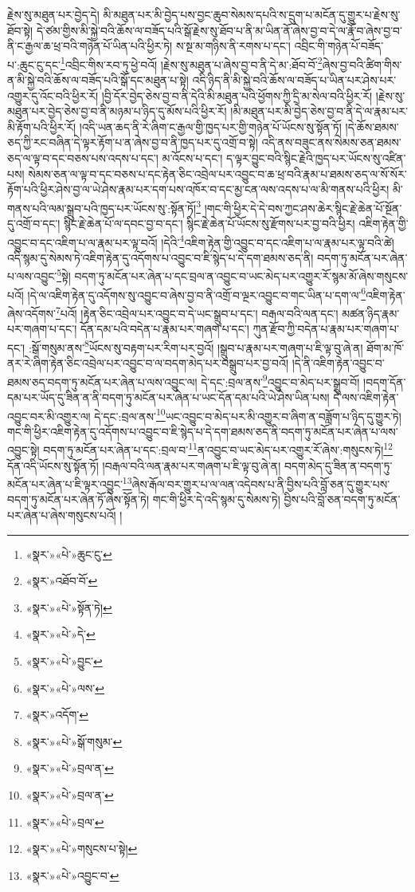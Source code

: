 རྗེས་སུ་མཐུན་པར་བྱེད་དེ། མི་མཐུན་པར་མི་བྱེད་པས་བྱང་ཆུབ་སེམས་དཔའི་ས་དྲུག་པ་མངོན་དུ་གྱུར་པ་རྗེས་སུ་ཐོབ་སྟེ། དེ་ཙམ་གྱིས་མི་སྐྱེ་བའི་ཆོས་ལ་བཟོད་པའི་སྒོ་རྗེས་སུ་ཐོབ་པ་ནི་མ་ཡིན་ནོ་ཞེས་བྱ་བ་དེ་ལ་རྣོ་བ་ཞེས་བྱ་བ་ནི་ང་རྒྱལ་ཆ་ཕྲ་བའི་གཉེན་པོ་ཡིན་པའི་ཕྱིར་ཏེ། ས་སྔ་མ་གཉིས་ནི་རགས་པ་དང་། འབྲིང་གི་གཉེན་པོ་བཟོད་པ་:ཆུང་ངུ་དང་\footnote{«སྣར་»«པེ་»ཆུང་ངུ་}འབྲིང་གིས་རབ་ཏུ་ཕྱེ་བའོ། །རྗེས་སུ་མཐུན་པ་ཞེས་བྱ་བ་ནི་དེ་མ་:ཐོབ་བོ་\footnote{«སྣར་»འཐོབ་བོ་}ཞེས་བྱ་བའི་ཚིག་གིས་ན་མི་སྐྱེ་བའི་ཆོས་ལ་བཟོད་པའི་སྒོ་དང་མཐུན་པ་སྟེ། འདི་ཉིད་ནི་མི་སྐྱེ་བའི་ཆོས་ལ་བཟོད་པ་ཡིན་པར་ཤེས་པར་འགྱུར་དུ་འོང་བའི་ཕྱིར་རོ། །བྱི་དོར་བྱེད་ཅེས་བྱ་བ་ནི་དེའི་མི་མཐུན་པའི་ཕྱོགས་ཀྱི་དྲི་མ་སེལ་བའི་ཕྱིར་རོ། །རྗེས་སུ་མཐུན་པར་བྱེད་ཅེས་བྱ་བ་ནི་མཉམ་པ་ཉིད་དུ་མོས་པའི་ཕྱིར་རོ། །མི་མཐུན་པར་མི་བྱེད་ཅེས་བྱ་བ་ནི་དེ་ལ་རྣམ་པར་མི་རྟོག་པའི་ཕྱིར་རོ། །འདི་ཡན་ཆད་ནི་རེ་ཞིག་ང་རྒྱལ་གྱི་ཁྱད་པར་གྱི་གཉེན་པོ་ཡོངས་སུ་སྟོན་ཏོ། །དེ་ཆོས་ཐམས་ཅད་ཀྱི་རང་བཞིན་དེ་ལྟར་རྟོག་པ་ན་ཞེས་བྱ་བ་ནི་ཁྱད་པར་དུ་འགྲོ་བ་སྟེ། འདི་ནས་བཟུང་ནས་སེམས་ཅན་ཐམས་ཅད་ལ་ལྟ་བ་དང་བཅས་པས་འདས་པ་དང་། མ་འོངས་པ་དང་། ད་ལྟར་བྱུང་བའི་སྙིང་རྗེའི་ཁྱད་པར་ཡོངས་སུ་འཛིན་པས། སེམས་ཅན་ལ་ལྟ་བ་དང་བཅས་པ་དང་རྟེན་ཅིང་འབྲེལ་པར་འབྱུང་བ་ཆ་ཕྲ་བའི་རྣམ་པ་ཐམས་ཅད་ལ་སོ་སོར་རྟོག་པའི་ཕྱིར་ཤེས་བྱ་ལ་ཡེ་ཤེས་རྣམ་པར་དག་པས་འཁོར་བ་དང་མྱ་ངན་ལས་འདས་པ་ལ་མི་གནས་པའི་ཕྱིར། མི་གནས་པའི་ལམ་སྒྲུབ་པའི་ཁྱད་པར་ཡོངས་སུ་:སྟོན་ཏོ།\footnote{«སྣར་»«པེ་»སྟོན་ཏེ།} །གང་གི་ཕྱིར་དེ་དེ་བས་ཀྱང་ཤས་ཆེར་སྙིང་རྗེ་ཆེན་པོ་སྔོན་དུ་འགྲོ་བ་དང་། སྙིང་རྗེ་ཆེན་པོ་ལ་དབང་བྱ་བ་དང་། སྙིང་རྗེ་ཆེན་པོ་ཡོངས་སུ་རྫོགས་པར་བྱ་བའི་ཕྱིར། འཇིག་རྟེན་གྱི་འབྱུང་བ་དང་འཇིག་པ་ལ་རྣམ་པར་ལྟ་བའོ། །དེའི་\footnote{«སྣར་»«པེ་»དེ་}འཇིག་རྟེན་གྱི་འབྱུང་བ་དང་འཇིག་པ་ལ་རྣམ་པར་ལྟ་བའི་ཚེ། འདི་སྙམ་དུ་སེམས་ཏེ་འཇིག་རྟེན་དུ་འདོགས་པ་འབྱུང་བ་ཇི་སྙེད་པ་དེ་དག་ཐམས་ཅད་ནི། བདག་ཏུ་མངོན་པར་ཞེན་པ་ལས་འབྱུང་\footnote{«སྣར་»«པེ་»བྱུང་}སྟེ། བདག་ཏུ་མངོན་པར་ཞེན་པ་དང་བྲལ་ན་འབྱུང་བ་ཡང་མེད་པར་འགྱུར་རོ་སྙམ་མོ་ཞེས་གསུངས་པའོ། །དེ་ལ་འཇིག་རྟེན་དུ་འདོགས་སུ་འབྱུང་བ་ཞེས་བྱ་བ་ནི་འགྲོ་བ་ལྔར་འབྱུང་བ་གང་ཡིན་པ་དག་ལ་\footnote{«སྣར་»«པེ་»ལས་}འཇིག་རྟེན་ཞེས་འདོགས་\footnote{«སྣར་»འདོག་}པའོ། །རྟེན་ཅིང་འབྲེལ་པར་འབྱུང་བ་དེ་ཡང་སྒྲུབ་པ་དང་། བརྒལ་བའི་ལན་དང་། མཚན་ཉིད་རྣམ་པར་གཞག་པ་དང་། དོན་དམ་པའི་བདེན་པ་རྣམ་པར་གཞག་པ་དང་། ཀུན་རྫོབ་ཀྱི་བདེན་པ་རྣམ་པར་གཞག་པ་དང་། :སྒོ་གསུམ་ནས་\footnote{«སྣར་»«པེ་»སྒོ་གསུམ་}ཡོངས་སུ་བརྟག་པར་རིག་པར་བྱའོ། །སྒྲུབ་པ་རྣམ་པར་གཞག་པ་ཇི་ལྟ་བུ་ཞེ་ན། ཐོག་མ་ཁོ་ནར་རེ་ཞིག་རྟེན་ཅིང་འབྲེལ་པར་འབྱུང་བ་ལ་བདག་མེད་པར་བསྒྲུབ་པར་བྱ་བའོ། །དེ་ནི་འཇིག་རྟེན་འབྱུང་བ་ཐམས་ཅད་བདག་ཏུ་མངོན་པར་ཞེན་པ་ལས་འབྱུང་ལ། དེ་དང་:བྲལ་ནས་\footnote{«སྣར་»«པེ་»བྲལ་ན་}འབྱུང་བ་མེད་པར་སྒྲུབ་བོ། །བདག་དོན་དམ་པར་ཡོད་དུ་ཟིན་ན་ནི་བདག་ཏུ་མངོན་པར་ཞེན་པ་ཡང་དོན་དམ་པའི་ཡེ་ཤེས་ཡིན་པས། དེ་ལས་འཇིག་རྟེན་འབྱུང་བར་མི་འགྱུར་ལ། དེ་དང་:བྲལ་ནས་\footnote{«སྣར་»«པེ་»བྲལ་ན་}ཡང་འབྱུང་བ་མེད་པར་མི་འགྱུར་བ་ཞིག་ན་བཟློག་པ་ཉིད་དུ་གྱུར་ཏེ། གང་གི་ཕྱིར་འཇིག་རྟེན་དུ་འདོགས་པ་འབྱུང་བ་ཇི་སྙེད་པ་དེ་དག་ཐམས་ཅད་ནི་བདག་ཏུ་མངོན་པར་ཞེན་པ་ལས་འབྱུང་སྟེ། བདག་ཏུ་མངོན་པར་ཞེན་པ་དང་:བྲལ་བ་\footnote{«སྣར་»«པེ་»བྲལ་}ན་འབྱུང་བ་ཡང་མེད་པར་འགྱུར་རོ་ཞེས་:གསུངས་ཏེ།\footnote{«སྣར་»«པེ་»གསུངས་པ་སྟེ།} དོན་འདི་ཡོངས་སུ་སྟོན་ཏོ། །བརྒལ་བའི་ལན་རྣམ་པར་གཞག་པ་ཇི་ལྟ་བུ་ཞེ་ན། བདག་མེད་དུ་ཟིན་ན་བདག་ཏུ་མངོན་པར་ཞེན་པ་ཇི་ལྟར་འབྱུང་\footnote{«སྣར་»«པེ་»འབྱུང་བ་}ཞེས་རྒོལ་བར་གྱུར་པ་ལ་ལན་འདེབས་པ་ནི་བྱིས་པའི་བློ་ཅན་དུ་གྱུར་པས་བདག་ཏུ་མངོན་པར་ཞེན་ཏོ་ཞེས་སྟོན་ཏེ། གང་གི་ཕྱིར་དེ་འདི་སྙམ་དུ་སེམས་ཏེ། བྱིས་པའི་བློ་ཅན་བདག་ཏུ་མངོན་པར་ཞེན་པ་ཞེས་གསུངས་པའོ། །
